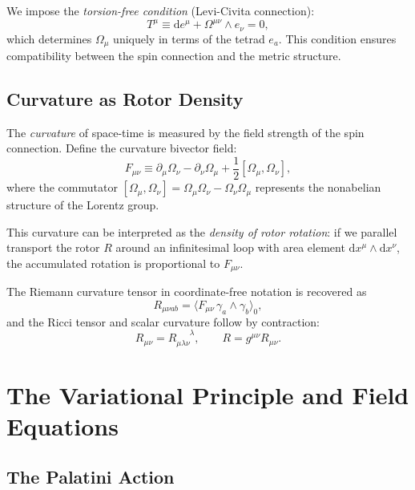 \documentclass[11pt,a4paper]{article}
\numberwithin{equation}{section}
\theoremstyle{plain}
\theoremstyle{definition}
\theoremstyle{remark}
\newcommand{\dd}{\mathrm{d}}
\begin{document}
We impose the \emph{torsion-free condition} (Levi-Civita connection):
\begin{equation}
T^\mu \equiv \dd e^\mu + \Omega^{\mu\nu} \wedge e_\nu = 0,
\label{eq:torsion-free}
\end{equation}
which determines $\Omega_\mu$ uniquely in terms of the tetrad $e_a$. This condition ensures compatibility between the spin connection and the metric structure.

\subsection{Curvature as Rotor Density}

The \emph{curvature} of space-time is measured by the field strength of the spin connection. Define the curvature bivector field:
\begin{equation}
F_{\mu\nu} \equiv \partial_\mu \Omega_\nu - \partial_\nu \Omega_\mu + \frac{1}{2}[\Omega_\mu, \Omega_\nu],
\label{eq:curvature}
\end{equation}
where the commutator $[\Omega_\mu, \Omega_\nu] = \Omega_\mu \Omega_\nu - \Omega_\nu \Omega_\mu$ represents the nonabelian structure of the Lorentz group.

This curvature can be interpreted as the \emph{density of rotor rotation}: if we parallel transport the rotor $R$ around an infinitesimal loop with area element $\dd x^\mu \wedge \dd x^\nu$, the accumulated rotation is proportional to $F_{\mu\nu}$.

The Riemann curvature tensor in coordinate-free notation is recovered as
\begin{equation}
R_{\mu\nu ab} = \langle F_{\mu\nu}\, \gamma_a \wedge \gamma_b \rangle_0,
\end{equation}
and the Ricci tensor and scalar curvature follow by contraction:
\begin{equation}
R_{\mu\nu} = R_{\mu\lambda\nu}^{\phantom{\mu\lambda\nu}\lambda}, \qquad R = g^{\mu\nu} R_{\mu\nu}.
\end{equation}

\section{The Variational Principle and Field Equations}
\label{sec:main}

\subsection{The Palatini Action}
\end{document}
